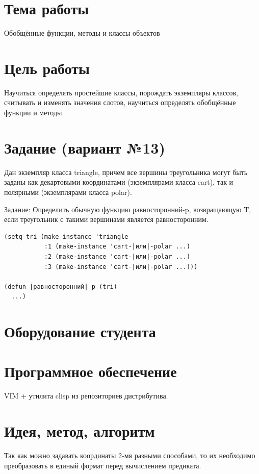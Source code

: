 \documentclass[12pt]{article}
\begin{document}

\section{Тема работы}
Обобщённые функции, методы и классы объектов

\section{Цель работы}
Научиться определять простейшие классы, порождать экземпляры классов,
считывать и изменять значения слотов, научиться определять обобщённые
функции и методы.

\section{Задание (вариант №13)}
\noindent
Дан экземпляр класса triangle, причем все вершины треугольника могут
быть заданы как декартовыми координатами (экземплярами класса cart),
так и полярными (экземплярами класса polar).

Задание: Определить обычную функцию равносторонний-p, возвращающую T,
если треугольник с такими вершинами является равносторонним.

\begin{lstlisting}
(setq tri (make-instance 'triangle
           :1 (make-instance 'cart-|или|-polar ...)
           :2 (make-instance 'cart-|или|-polar ...)
           :3 (make-instance 'cart-|или|-polar ...)))

(defun |равносторонний|-p (tri)
  ...)
\end{lstlisting}

\section{Оборудование студента}
\mypc

\section{Программное обеспечение}
VIM + утилита clisp из репозиториев дистрибутива.

\section{Идея, метод, алгоритм}

Так как можно задавать координаты 2-мя разными способами, то их необходимо
преобразовать в единый формат перед вычислением предиката.
\end{document}
